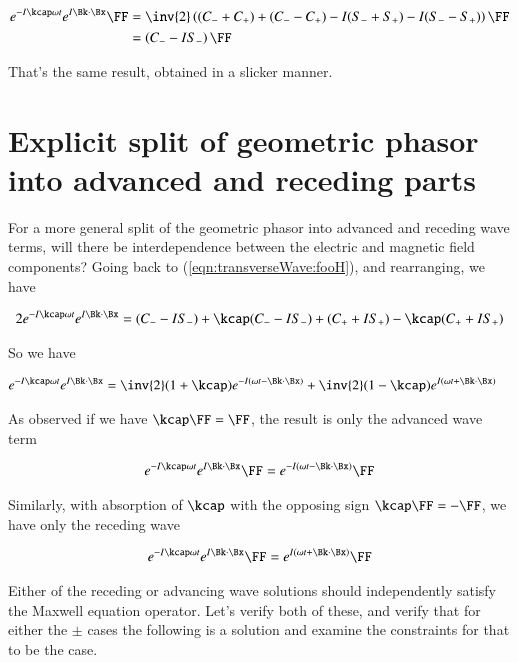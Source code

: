 \begin{align*}
e^{ -I \kcap \omega t } e^{ I \Bk \cdot \Bx } \FF
&=
\inv{2}
\left( 
(C_{-} + C_{+})
+(C_{-} - C_{+})
-I (S_{-} + S_{+})
-I (S_{-} - S_{+})
\right) \FF \\
&=
\left( C_{-} -I S_{-} \right) \FF
\end{align*}

That's the same result, obtained in a slicker manner.

\section{Explicit split of geometric phasor into advanced and receding parts}

For a more general split of the geometric phasor into advanced and receding wave terms, will there be interdependence between the electric and magnetic field components?   Going back to (\ref{eqn:transverseWave:fooH}), and rearranging, we have

\begin{align*}
2 e^{ -I \kcap \omega t } e^{ I \Bk \cdot \Bx }
&=
(C_{-} -I S_{-})
+\kcap (C_{-} -I S_{-} )
+(C_{+} +I S_{+})
-\kcap (C_{+} +I S_{+}) \\
\end{align*}

So we have

\begin{align}\label{eqn:transverseWave:fooJ}
e^{ -I \kcap \omega t } e^{ I \Bk \cdot \Bx }
&=
\inv{2}(1 + \kcap)e^{-I(\omega t - \Bk \cdot \Bx)}
+\inv{2}(1 - \kcap)e^{I(\omega t + \Bk \cdot \Bx)}
\end{align}

As observed if we have $\kcap \FF = \FF$, the result is only the advanced wave term

\begin{align*}
e^{ -I \kcap \omega t } e^{ I \Bk \cdot \Bx } \FF = e^{-I(\omega t - \Bk \cdot \Bx)} \FF
\end{align*}

Similarly, with absorption of $\kcap$ with the opposing sign $\kcap \FF = -\FF$, we have only the receding wave

\begin{align*}
e^{ -I \kcap \omega t } e^{ I \Bk \cdot \Bx } \FF = e^{I(\omega t + \Bk \cdot \Bx)} \FF
\end{align*}

Either of the receding or advancing wave solutions should independently satisfy the Maxwell equation operator.  Let's verify both of these, and verify that for either the $\pm$ cases the following is a solution and examine the constraints for that to be the case.

